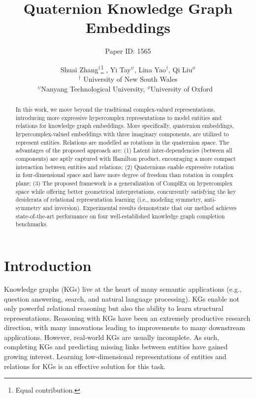 \documentclass{article}
\title{Quaternion Knowledge Graph Embeddings}
\author{Paper ID: 1565}
\author{
Shuai Zhang$^\dagger$\thanks{Equal contribution.} , Yi Tay$^\psi$\footnotemark[1], Lina Yao$^\dagger$, Qi Liu$^\phi$\\
 $^\dagger$ University of New South Wales \\
 $^\psi$Nanyang Technological University, $^\phi$University of Oxford \
}
\begin{document}
\maketitle

\begin{abstract}
In this work, we move beyond the traditional complex-valued representations, introducing more expressive hypercomplex representations to model entities and relations for knowledge graph embeddings. More specifically, quaternion embeddings, hypercomplex-valued embeddings with three imaginary components, are utilized to represent entities. Relations are modelled as rotations in the quaternion space. The advantages of the proposed approach are: (1) Latent inter-dependencies (between all components) are aptly captured with Hamilton product, encouraging a more compact interaction between entities and relations; (2) Quaternions enable expressive rotation in four-dimensional space and have more degree of freedom than rotation in complex plane; (3) The proposed framework is a generalization of ComplEx on hypercomplex space while offering better geometrical interpretations, concurrently satisfying the key desiderata of relational representation learning (i.e., modeling symmetry, anti-symmetry and inversion). Experimental results demonstrate that our method achieves state-of-the-art performance on four well-established knowledge graph completion benchmarks.








\end{abstract}

\section{Introduction}
Knowledge graphs (KGs) live at the heart of many semantic applications (e.g., question answering, search, and natural language processing). KGs enable not only powerful relational reasoning but also the ability to learn structural representations. Reasoning with KGs have been an extremely productive research direction, with many innovations leading to improvements to many downstream applications. However, real-world KGs are usually incomplete. As such, completing KGs and predicting missing links between entities have gained growing interest. Learning low-dimensional representations of entities and relations for KGs is an effective solution for this task.
\end{document}
